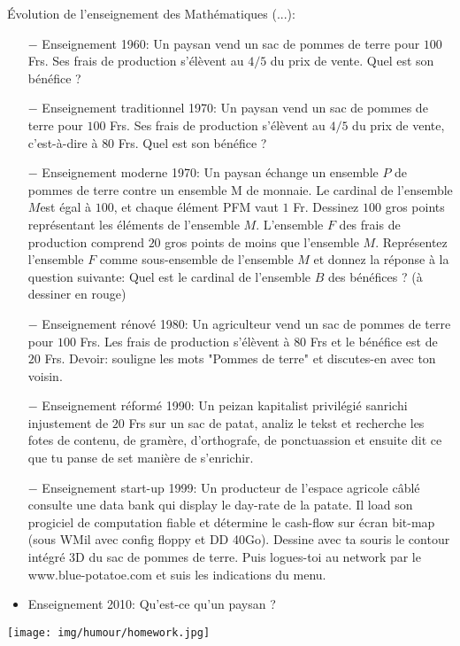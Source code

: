 	\pagebreak
Évolution de l'enseignement des Mathématiques (...):

\begin{itemize}	 
	\item[$-$] Enseignement 1960: Un paysan vend un sac de pommes de terre pour $100$ Frs. Ses frais de production s'élèvent au $4/5$ du prix de vente. Quel est son bénéfice ?

	\item[$-$] Enseignement traditionnel 1970: Un paysan vend un sac de pommes de terre pour $100$ Frs. Ses frais de production s'élèvent au $4/5$ du prix de vente, c'est-à-dire à $80$ Frs. Quel est son bénéfice ?

	\item[$-$] Enseignement moderne 1970: Un paysan échange un ensemble $P$ de pommes de terre contre un ensemble M de monnaie. Le cardinal de l'ensemble $M $est égal à $100$, et chaque élément PFM vaut $1$ Fr. Dessinez $100$ gros points représentant les éléments de l'ensemble $M$. L'ensemble $F$ des frais de production comprend $20$ gros points de moins que l'ensemble $M$. Représentez l'ensemble $F$ comme sous-ensemble de l'ensemble $M$ et donnez la réponse à la question suivante: Quel est le cardinal de l'ensemble $B$ des bénéfices ? (à dessiner en rouge)

	\item[$-$] Enseignement rénové 1980: Un agriculteur vend un sac de pommes de terre pour $100$ Frs. Les frais de production s'élèvent à $80$ Frs et le bénéfice est de $20$ Frs. Devoir: souligne les mots "Pommes de terre" et discutes-en avec ton voisin.

	\item[$-$] Enseignement réformé 1990: Un peizan kapitalist privilégié sanrichi injustement de $20$ Frs sur un sac de patat, analiz le tekst et recherche les fotes de contenu, de gramère, d'orthografe, de ponctuassion et ensuite dit ce que tu panse de set manière de s'enrichir.

	\item[$-$] Enseignement start-up 1999: Un producteur de l'espace agricole câblé consulte une data bank qui display le day-rate de la patate. Il load son progiciel de computation fiable et détermine le cash-flow sur écran bit-map (sous WMil avec config floppy et DD 40Go). Dessine avec ta souris le contour intégré 3D du sac de pommes de terre. Puis logues-toi au network par le www.blue-potatoe.com et suis les indications du menu.
	
	\item Enseignement 2010: Qu'est-ce qu'un paysan ?

\end{itemize}
	\begin{center}\underline{\hspace{5 cm}}\end{center}
	\begin{center}
		\texttt{[image: img/humour/homework.jpg]}	
	\end{center}

